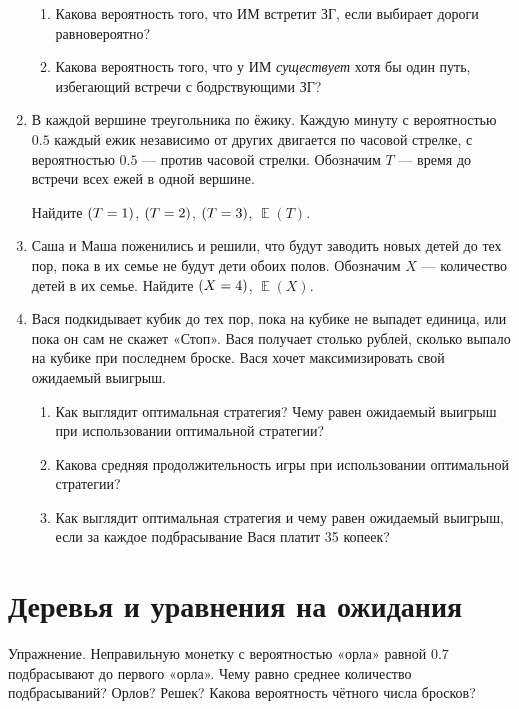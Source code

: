 \documentclass[12pt]{article}
\DeclareMathOperator{\E}{\mathbb{E}}
\let\P\relax
\DeclareMathOperator{\P}{\mathbb{P}}
\theoremstyle{definition}
\begin{document}
\begin{enumerate}
\begin{enumerate}
  \item Какова вероятность того, что ИМ встретит ЗГ, если выбирает дороги равновероятно?
  \item Какова вероятность того, что у ИМ \textit{существует} хотя бы один путь, избегающий встречи с бодрствующими ЗГ?
\end{enumerate}

\item В каждой вершине треугольника по ёжику. Каждую минуту с вероятностью $0.5$ каждый ежик
независимо от других двигается по часовой стрелке, с вероятностью
$0.5$ — против часовой стрелки.
Обозначим $T$ — время до встречи всех ежей в одной вершине.

Найдите $\P(T=1)$, $\P(T=2)$, $\P(T=3)$, $\E(T)$.

\item Саша и Маша поженились и решили, что будут заводить новых детей до тех пор,
пока в их семье не будут дети обоих полов. Обозначим $X$ — количество детей в их семье.
Найдите $\P(X=4)$, $\E(X)$.

\item Вася подкидывает кубик до тех пор, пока на кубике не выпадет единица, или пока он сам не скажет «Стоп». 
Вася получает столько рублей, сколько выпало на кубике при последнем броске. 
Вася хочет максимизировать свой ожидаемый выигрыш.
\begin{enumerate}
\item Как выглядит оптимальная стратегия? Чему равен ожидаемый выигрыш при использовании оптимальной стратегии?
\item Какова средняя продолжительность игры при использовании оптимальной стратегии?
\item Как выглядит оптимальная стратегия и чему равен ожидаемый выигрыш, если за каждое
подбрасывание Вася платит 35 копеек?
\end{enumerate}

\end{enumerate}


\section{Деревья и уравнения на ожидания}

Упражнение. Неправильную монетку с вероятностью «орла» равной $0.7$ подбрасывают до первого «орла».
Чему равно среднее количество подбрасываний?  Орлов? Решек? Какова вероятность чётного числа бросков? 
\end{document}
